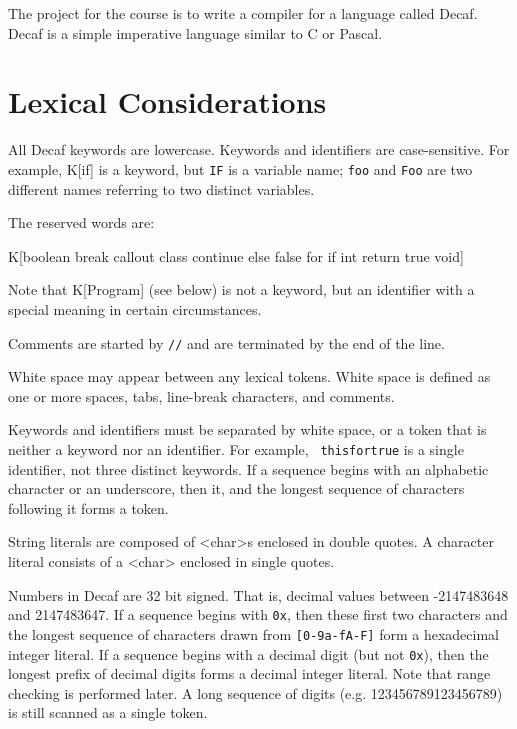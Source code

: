 
{\bnf
\gdef\kw#1{{\bnf K[#1]}}
\gdef\term#1{{\bnf T[#1]}}
\gdef\nt#1{{\bnf <#1>}}}



The project for the course is to write a compiler for a language
called Decaf.  Decaf is a simple imperative language similar to C or
Pascal.

\section*{Lexical Considerations}

All Decaf keywords are lowercase.  Keywords and
identifiers are case-sensitive.  For example, \kw{if} is a keyword,
but {\tt IF} is a variable name; {\tt foo} and {\tt Foo} are two
different names referring to two distinct variables.

The reserved words are:


\kw{boolean break callout class continue else false for
  if int return true void}

Note that \kw{Program} (see below) is not a keyword, but an identifier
with a special meaning in certain circumstances.

Comments are started by {\tt //} and are terminated by the end of the
line.

White space may appear between any lexical tokens.  White space is
defined as one or more spaces, tabs, line-break
characters, and comments.

Keywords and identifiers must be separated by white space, or a token
that is neither a keyword nor an identifier.  For example, {\tt
thisfortrue} is a single identifier, not three distinct keywords.
If a sequence begins with an alphabetic character or an underscore,
then it, and the longest sequence of characters following it forms a
token.

String literals are composed of {\bnf <char>}s enclosed in double
quotes.  A character literal consists of a {\bnf <char>} enclosed in
single quotes.

Numbers in Decaf are 32 bit signed. That is, decimal values between
-2147483648 and 2147483647.  If a sequence begins with {\tt 0x}, then
these first two characters and the longest sequence of characters
drawn from {\tt [0-9a-fA-F]} form a hexadecimal integer literal.  If a
sequence begins with a decimal digit (but not {\tt 0x}), then the
longest prefix of decimal digits forms a decimal integer literal.
Note that range checking is performed later.  A long sequence of
digits (e.g. 123456789123456789) is still scanned as a single token.

